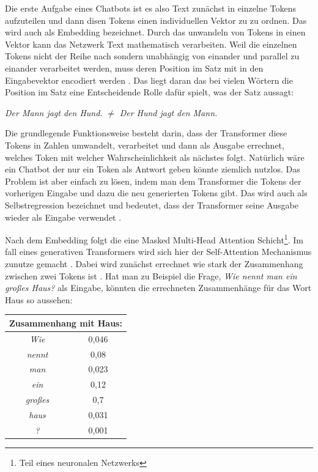 	
	Die erste Aufgabe eines Chatbots ist es also Text zunächst in einzelne Tokens aufzuteilen und dann disen Tokens 
	einen individuellen Vektor zu zu ordnen. Das wird auch als Embedding bezeichnet. Durch das unwandeln von Tokens in 
	einen Vektor kann das Netzwerk Text mathematisch verarbeiten. Weil die einzelnen Tokens nicht der Reihe nach sondern 
	unabhängig von einander und parallel zu einander verarbeitet werden, muss deren Position im Satz mit in den Eingabevektor 
	encodiert werden \cite[S. 2f]{vaswani2017}. Das liegt daran das bei vielen Wörtern die Position im Satz eine 
	Entscheidende Rolle dafür spielt, was der Satz aussagt:

	\vspace{3mm}
	\emph{Der Mann jagt den Hund.} 	
	\space $\neq$ \space
	\emph{Der Hund jagt den Mann.}
	
	\clearpage
	\noindent
	Die grundlegende Funktionsweise besteht darin, dass der Transformer diese Tokens in Zahlen umwandelt, verarbeitet und dann 
	als Ausgabe errechnet, welches Token mit welcher Wahrscheinlichkeit als nächstes folgt. Natürlich wäre ein Chatbot der nur
	ein Token als Antwort geben könnte ziemlich nutzlos. Das Problem ist aber einfach zu lösen, indem man dem Transformer
	die Tokens der vorherigen Eingabe und dazu die neu generierten Tokens gibt. Das wird auch als Selbstregression bezeichnet und 
	bedeutet, dass der Transformer seine Ausgabe wieder als Eingabe verwendet \cite[S. 2]{vaswani2017}.  

	Nach dem Embedding folgt die eine Masked Multi-Head Attention Schicht\footnote{Teil eines neuronalen Netzwerks}.
	Im fall eines generativen Transformers wird sich hier der  Self-Attention Mechanismus zunutze gemacht \cite[S. 2f]{turner2024}. 
	Dabei wird zunächst errechnet wie stark der Zusammenhang zwischen zwei Tokens ist \cite[S. 4]{vaswani2017}. Hat man zu 
	Beispiel die Frage, \emph{Wie nennt man ein großes Haus?} als Eingabe, könnten die errechneten Zusammenhänge für das 
	Wort Haus so aussehen: 
	
	\vspace{5mm}
	\begin{tabular}{ |c|c| }
  		\hline
	  	\multicolumn{2}{|c|}{Zusammenhang mit Haus: } \\
	  	\hline
	  	\emph{Wie} & 0,046 \\
	  	\hline
	  	\emph{nennt} & 0,08 \\
		\hline
	  	\emph{man} & 0,023 \\
	  	\hline
		\emph{ein} & 0,12 \\
	  	\hline
		\emph{großes} & 0,7 \\
	  	\hline
		\emph{haus} & 0,031 \\
		\hline
		\emph{?} & 0,001 \\
		\hline
	\end{tabular}
	\vspace{5mm}
	
